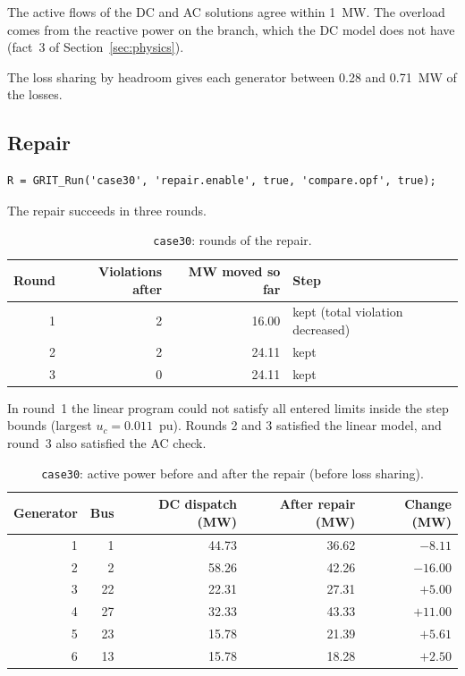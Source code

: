 \documentclass[a4paper,11pt]{article}
\begin{document}
The active flows of the DC and AC solutions agree within 1~MW. The overload comes from the reactive power on the branch, which the DC model does not have (fact~3 of Section~\ref{sec:physics}).

The loss sharing by headroom gives each generator between 0.28 and 0.71~MW of the losses.

\subsection{Repair}

\begin{lstlisting}
R = GRIT_Run('case30', 'repair.enable', true, 'compare.opf', true);
\end{lstlisting}

The repair succeeds in three rounds.

\begin{table}[H]\centering
\begin{tabular}{@{}rrrl@{}}
\toprule
\textbf{Round} & \textbf{Violations after} & \textbf{MW moved so far} & \textbf{Step} \\
\midrule
1 & 2 & 16.00 & kept (total violation decreased) \\
2 & 2 & 24.11 & kept \\
3 & 0 & 24.11 & kept \\
\bottomrule
\end{tabular}
\caption{\texttt{case30}: rounds of the repair.}
\end{table}

In round~1 the linear program could not satisfy all entered limits inside the step bounds (largest $u_c = 0.011$~pu). Rounds 2 and 3 satisfied the linear model, and round~3 also satisfied the AC check.

\begin{table}[H]\centering
\begin{tabular}{@{}rrrrr@{}}
\toprule
\textbf{Generator} & \textbf{Bus} & \textbf{DC dispatch (MW)} & \textbf{After repair (MW)} & \textbf{Change (MW)} \\
\midrule
1 & 1 & 44.73 & 36.62 & $-8.11$ \\
2 & 2 & 58.26 & 42.26 & $-16.00$ \\
3 & 22 & 22.31 & 27.31 & $+5.00$ \\
4 & 27 & 32.33 & 43.33 & $+11.00$ \\
5 & 23 & 15.78 & 21.39 & $+5.61$ \\
6 & 13 & 15.78 & 18.28 & $+2.50$ \\
\bottomrule
\end{tabular}
\caption{\texttt{case30}: active power before and after the repair (before loss sharing).}
\end{table}
\end{document}
